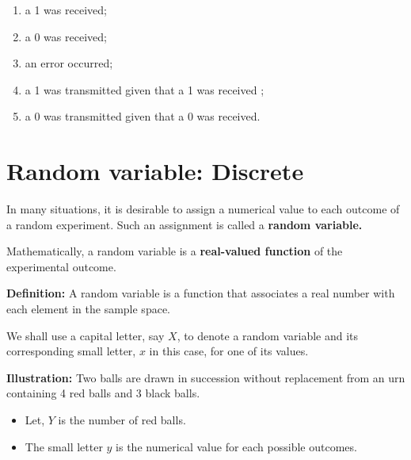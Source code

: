 \documentclass[
  11pt,
  letterpaper,
  DIV=11,
  numbers=noendperiod]{scrreprt}
\begin{document}
\begin{enumerate}
\def\labelenumi{(\alph{enumi})}
\item
  a 1 was received;
\item
  a 0 was received;
\item
  an error occurred;
\item
  a 1 was transmitted given that a 1 was received ;
\item
  a 0 was transmitted given that a 0 was received.
\end{enumerate}


\chapter{Random variable: Discrete}\label{random-variable-discrete}

In many situations, it is desirable to assign a numerical value to each
outcome of a random experiment. Such an assignment is called a
\textbf{random variable.}

Mathematically, a random variable is a \textbf{real-valued function} of
the experimental outcome.

\textbf{Definition:} A random variable is a function that associates a
real number with each element in the sample space.

\begin{tcolorbox}[enhanced jigsaw, bottomrule=.15mm, toprule=.15mm, title=\textcolor{quarto-callout-note-color}{\faInfo}\hspace{0.5em}{Note}, bottomtitle=1mm, colframe=quarto-callout-note-color-frame, coltitle=black, rightrule=.15mm, toptitle=1mm, colbacktitle=quarto-callout-note-color!10!white, titlerule=0mm, breakable, arc=.35mm, leftrule=.75mm, opacitybacktitle=0.6, opacityback=0, colback=white, left=2mm]

We shall use a capital letter, say \(X\), to denote a random variable
and its corresponding small letter, \(x\) in this case, for one of its
values.

\end{tcolorbox}

\textbf{Illustration:} Two balls are drawn in succession without
replacement from an urn containing 4 red balls and 3 black balls.

\begin{itemize}
\item
  Let, \(Y\) is the number of red balls.
\item
  The small letter \(y\) is the numerical value for each possible
  outcomes.
\end{itemize}
\end{document}
